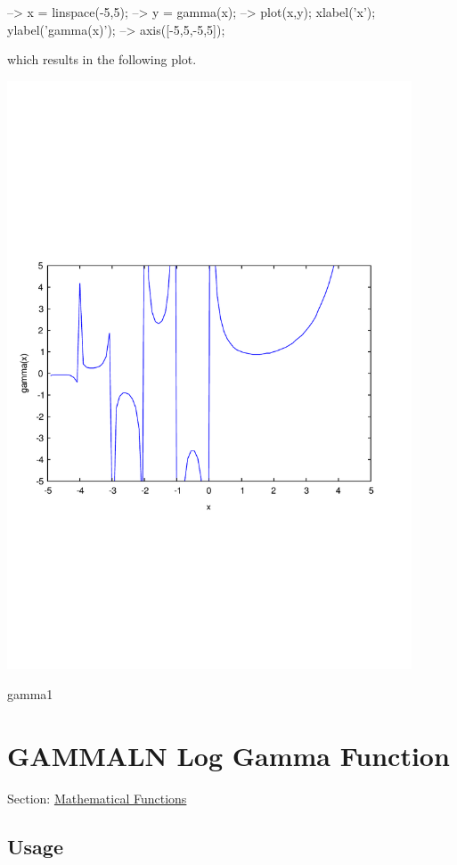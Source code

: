 \begin{DoxyVerbInclude}
--> x = linspace(-5,5);
--> y = gamma(x);
--> plot(x,y); xlabel('x'); ylabel('gamma(x)');
--> axis([-5,5,-5,5]);
\end{DoxyVerbInclude}


which results in the following plot.  
\begin{DoxyImage}
\includegraphics[width=12cm]{gamma1}
\caption{gamma1}
\end{DoxyImage}
 \hypertarget{mathfunctions_gammaln}{}\section{G\-A\-M\-M\-A\-L\-N Log Gamma Function}\label{mathfunctions_gammaln}
Section\-: \hyperlink{sec_mathfunctions}{Mathematical Functions} \hypertarget{vtkwidgets_vtkxyplotwidget_Usage}{}\subsection{Usage}\label{vtkwidgets_vtkxyplotwidget_Usage}
